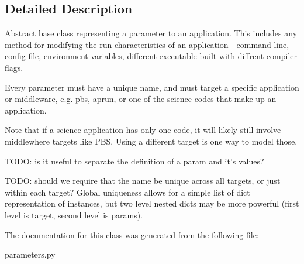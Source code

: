 \subsection{Detailed Description}
\begin{DoxyVerb}Abstract base class representing a parameter to an application. This
includes any method for modifying the run characteristics of an
application - command line, config file, environment variables, different
executable built with diffrent compiler flags.

Every parameter must have a unique name, and must target a specific
application or middleware, e.g. pbs, aprun, or one of the science
codes that make up an application.

Note that if a science application has only one code, it will likely still
involve middlewhere targets like PBS. Using a different target is one way
to model those.

TODO: is it useful to separate the definition of a param and it's values?

TODO: should we require that the name be unique across all targets, or
just within each target? Global uniqueness allows for a simple list of
dict representation of instances, but two level nested dicts may be
more powerful (first level is target, second level is params).\end{DoxyVerb}
 

The documentation for this class was generated from the following file\+:\begin{DoxyCompactItemize}
\item 
parameters.\+py\end{DoxyCompactItemize}
